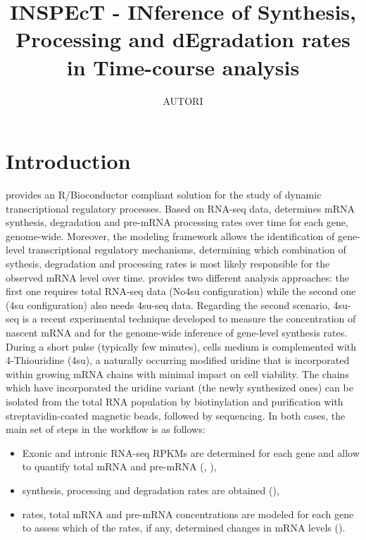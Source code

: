 \documentclass[11pt]{article}
\title{INSPEcT - INference of Synthesis, Processing and dEgradation rates in Time-course analysis}
\author{AUTORI}
\newcommand{\Rmethod}[1]{{\Rfunction{#1}}}
\begin{document}
\maketitle

\tableofcontents

%
\section{Introduction}

 provides an R/Bioconductor compliant solution for the study of dynamic transcriptional regulatory processes. Based on RNA-seq data,  determines mRNA synthesis, degradation and pre-mRNA processing rates over time for each gene, genome-wide. Moreover, the  modeling framework allows the identification of gene-level transcriptional regulatory mechanisms, determining which combination of sythesis, degradation and processing rates is most likely responsible for the observed mRNA level over time.
 provides two different analysis approaches: the first one requires total RNA-seq data (No4su configuration) while the second one (4su configuration) also needs 4su-seq data.
Regarding the second scenario, 4su-seq is a recent experimental technique developed to measure the concentration of nascent mRNA and for the genome-wide inference of gene-level synthesis rates. During a short pulse (typically few minutes), cells medium is complemented with 4-Thiouridine (4su), a naturally occurring modified uridine that is incorporated within growing mRNA chains with minimal impact on cell viability. The chains which have incorporated the uridine variant (the newly synthesized ones) can be isolated from the total RNA population by biotinylation and purification with streptavidin-coated magnetic beads, followed by sequencing. In both cases, the main set of steps in the  workflow is as follows:
\begin{itemize}
	\item Exonic and intronic RNA-seq RPKMs are determined for each gene and allow to quantify total mRNA and pre-mRNA (, ),
	\item synthesis, processing and degradation rates are obtained (\Rmethod{newINSPEcT}),
	\item rates, total mRNA and pre-mRNA concentrations are modeled for each gene to assess which of the rates, if any, determined changes in mRNA levels (\Rmethod{modelRates}).
\end{itemize}
\end{document}

